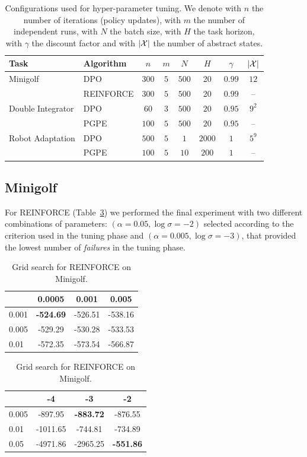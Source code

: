 \begin{table}
	\centering
	\begin{tabular}{ll|cccccc}
		\toprule
		\textbf{Task} & \textbf{Algorithm} & $n$ & $m$ & $N$ & $H$ & $\gamma$ & $|\mathcal{X}|$\\
		\midrule
		Minigolf & DPO & $300$ & $5$ & $500$ & 20 & $0.99$ & $12$ \\
		& REINFORCE & $300$ & $5$ & $500$ & 20 & $0.99$ & -- \\
		Double Integrator & DPO & $60$ & $3$ & $500$ & $20$ & $0.95$ & $9^{2}$ \\
		& PGPE & $100$ & $5$ & $500$ & $20$ & $0.95$ & -- \\
		Robot Adaptation & DPO & $500$ & $5$ & $1$ & $2000$ & $1$ & $5^{9}$ \\
		& PGPE & $100$ & $5$ & $10$ & $200$ & $1$ & --\\
		\midrule
	\end{tabular}
	\caption{\label{tab:recap1}Configurations used for hyper-parameter tuning. We denote with $n$ the number of iterations (policy updates), with $m$ the number of independent runs, with $N$ the batch size, with $H$ the task horizon, with $\gamma$ the discount factor and with $|\mathcal{X}|$ the number of abstract states.}
\end{table}

\subsection*{Minigolf}
For REINFORCE (Table~\ref{tab:t2}) we performed the final experiment with two different combinations of parameters: $(\alpha=0.05, \log\sigma=-2)$ selected according to the criterion used in the tuning phase and $(\alpha=0.005, \log\sigma=-3)$, that provided the lowest number of \emph{failures} in the tuning phase.
\begin{table}[H]
	\parbox{.45\linewidth}{
		\centering
		\begin{tabular}{l|*{3}{c}}
			\toprule
			\backslashbox{$\alpha$}{$\lambda$}
			&0.0005&0.001&0.005\\
			\midrule
			0.001 & \textbf{-524.69} & -526.51 & -538.16 \\
			0.005 & -529.29 & -530.28 & -533.53 \\
			0.01 & -572.35 & -573.54 & -566.87 \\
			\bottomrule
		\end{tabular} \caption{\label{tab:t1} Grid search for DPO on Minigolf.}
	}
	\hfill
	\parbox{.45\linewidth}{
		\centering
		\begin{tabular}{l|*{3}{c}}
			\toprule
			\backslashbox{$\alpha$}{$\log\sigma$}
			&-4&-3&-2\\
			\midrule
			0.005 & -897.95 & \textbf{-883.72} & -876.55 \\
			0.01 & -1011.65 & -744.81 & -734.89 \\
			0.05 & -4971.86 & -2965.25 & \textbf{-551.86} \\
			\bottomrule
		\end{tabular} \caption{\label{tab:t2}Grid search for REINFORCE on Minigolf.}
	}
\end{table}

